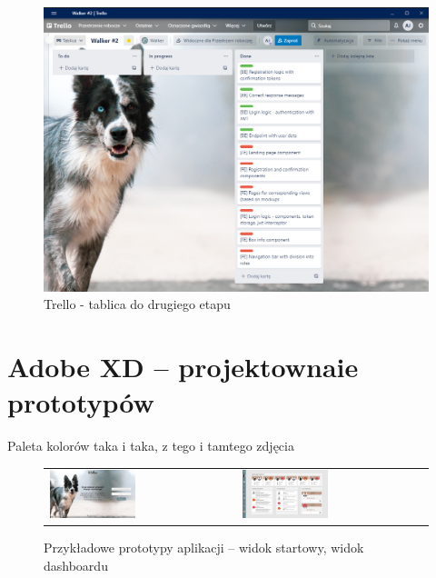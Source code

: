 \begin{figure}[H]
    \centering
    \includegraphics[width=0.7\linewidth]{rysunki/w2.PNG}
    \caption{Trello - tablica do drugiego etapu}
    \label{fig:walker-board-2}
\end{figure}  

\section{Adobe XD -- projektownaie prototypów}
Paleta kolorów taka i taka, z tego i tamtego zdjęcia

\begin{figure}[H]
    \centering
      \begin{tabular}{@{}ll@{}}
        \includegraphics[width=0.475\textwidth]{rysunki/Start.png} & 
        \includegraphics[width=0.475\textwidth]{rysunki/Home - owner.png}
      \end{tabular}
    \caption{Przykładowe prototypy aplikacji -- widok startowy, widok dashboardu}
    \label{fig:mocks-start-dashboard}
\end{figure}

